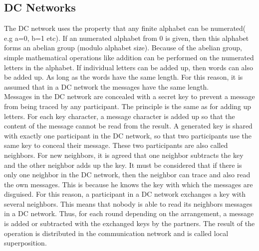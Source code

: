 \subsection{DC Networks}
The DC network uses the property that any finite alphabet can be numerated( e.g a=0, b=1 etc). If an numerated alphabet from 0 is given, then this alphabet forms an abelian group (modulo alphabet size). Because of the abelian group, simple mathematical operations like addition can be performed on the numerated letters in the alphabet. 
If individual letters can be added up, then words can also be added up. As long as the words have the same length. For this reason, it is assumed that in a DC network the messages have the same length.\\
Messages in the DC network are concealed with a secret key to prevent a message from being traced by any participant. The principle is the same as for adding up letters. For each key character, a message character is added up so that the content of the message cannot be read from the result. A generated key is shared with exactly one participant in the DC network, so that two participants use the same key to conceal their message. These two participants are also called neighbors. For new neighbors, it is agreed that one neighbor subtracts the key and the other neighbor adds up the key. It must be considered that if there is only one neighbor in the DC network, then the neighbor can trace and also read the own messages. This is because he knows the key with which the messages are disguised. For this reason, a participant in a DC network exchanges a key with several neighbors. This means that nobody is able to read its neighbors messages in a DC network. Thus, for each round depending on the arrangement, a message is added or subtracted with the exchanged keys by the partners. The result of the operation is distributed in the communication network and is called local superposition. 
